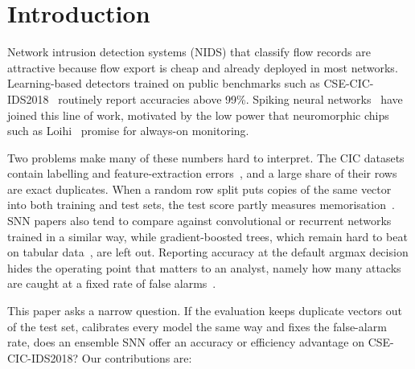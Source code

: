 \documentclass[conference]{IEEEtran}
\begin{document}
\section{Introduction}

Network intrusion detection systems (NIDS) that classify flow records are attractive because flow export is cheap and already deployed in most networks. Learning-based detectors trained on public benchmarks such as CSE-CIC-IDS2018~\cite{sharafaldin2018} routinely report accuracies above 99\%. Spiking neural networks~\cite{maass1997} have joined this line of work, motivated by the low power that neuromorphic chips such as Loihi~\cite{davies2018,davies2021} promise for always-on monitoring.

Two problems make many of these numbers hard to interpret. The CIC datasets contain labelling and feature-extraction errors~\cite{engelen2021,liu2022,flood2024}, and a large share of their rows are exact duplicates. When a random row split puts copies of the same vector into both training and test sets, the test score partly measures memorisation~\cite{kaufman2012,arp2022}. SNN papers also tend to compare against convolutional or recurrent networks trained in a similar way, while gradient-boosted trees, which remain hard to beat on tabular data~\cite{grinsztajn2022,shwartzziv2022}, are left out. Reporting accuracy at the default argmax decision hides the operating point that matters to an analyst, namely how many attacks are caught at a fixed rate of false alarms~\cite{apruzzese2023sok}.

This paper asks a narrow question. If the evaluation keeps duplicate vectors out of the test set, calibrates every model the same way and fixes the false-alarm rate, does an ensemble SNN offer an accuracy or efficiency advantage on CSE-CIC-IDS2018? Our contributions are:
\end{document}
